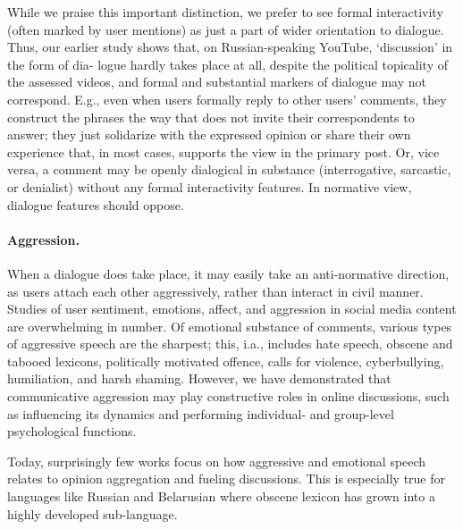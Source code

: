 While we praise this important distinction, we prefer to see formal interactivity (often marked by user mentions) as just a part of wider orientation to dialogue. Thus, our earlier study \cite{BodrunovaLitvinenkoBlekanov2021} shows that, on Russian-speaking YouTube, ‘discussion’ in the form of dia- logue hardly takes place at all, despite the political topicality of the assessed videos, and formal and substantial markers of dialogue may not correspond. E.g., even when users formally reply to other users’ comments, they construct the phrases the way that does not invite their correspondents to answer; they just solidarize with the expressed opinion or share their own experience that, in most cases, supports the view in the primary post. Or, vice versa, a comment may be openly dialogical in substance (interrogative, sarcastic, or denialist) without any formal interactivity features. In normative view, dialogue features should oppose.

\paragraph{Aggression.} When a dialogue does take place, it may easily take an anti-normative direction, as users attach each other aggressively, rather than interact in civil manner. Studies of user sentiment, emotions, affect, and aggression in social media content are overwhelming in number. Of emotional substance of comments, various types of aggressive speech are the sharpest; this, i.a., includes hate speech, obscene and tabooed lexicons, politically motivated offence, calls for violence, cyberbullying, humiliation, and harsh shaming. However, we have demonstrated \cite{BodrunovaLitvinenkoBlekanov2021,BodrunovaNigmatullinaBlekanov} that communicative aggression may play constructive roles in online discussions, such as influencing its dynamics and performing individual- and group-level psychological functions.

Today, surprisingly few works focus on how aggressive and emotional speech relates to opinion aggregation and fueling discussions. This is especially true for languages like Russian and Belarusian where obscene lexicon has grown into a highly developed sub-language.

